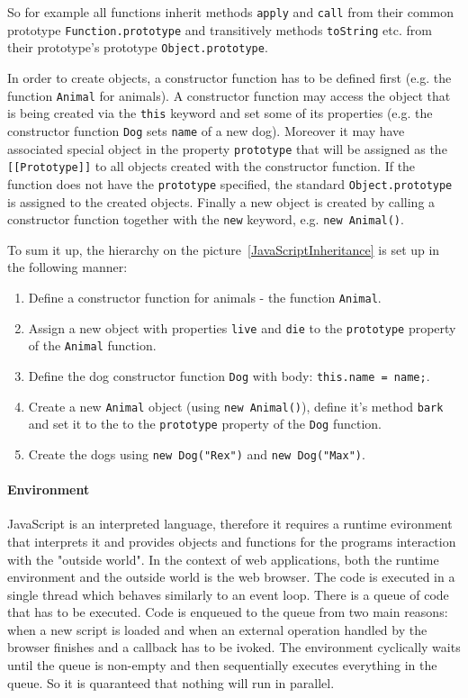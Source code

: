 \documentclass[12pt,a4paper]{report}
\begin{document}
So for example all functions inherit methods \texttt{apply} and \texttt{call} from their common prototype \texttt{Function.prototype} and transitively methods \texttt{toString} etc. from their prototype's prototype \texttt{Object.prototype}.

In order to create objects, a constructor function has to be defined first (e.g. the function \texttt{Animal} for animals). A constructor function may access the object that is being created via the \texttt{this} keyword and set some of its properties (e.g. the constructor function \texttt{Dog} sets \texttt{name} of a new dog). Moreover it may have associated special object in the property \texttt{prototype} that will be assigned as the \texttt{[[Prototype]]} to all objects created with the constructor function. If the function does not have the \texttt{prototype} specified, the standard \texttt{Object.prototype} is assigned to the created objects. Finally a new object is created by calling a constructor function together with the \texttt{new} keyword, e.g. \texttt{new Animal()}.

To sum it up, the hierarchy on the picture~\ref{JavaScriptInheritance} is set up in the following manner:

\begin{enumerate}
\item Define a constructor function for animals - the function \texttt{Animal}.
\item Assign a new object with properties \texttt{live} and \texttt{die} to the \texttt{prototype} property of the \texttt{Animal} function.
\item Define the dog constructor function \texttt{Dog} with body: \texttt{this.name = name;}.
\item Create a new \texttt{Animal} object (using \texttt{new Animal()}), define it's method \texttt{bark} and set it to the to the \texttt{prototype} property of the \texttt{Dog} function.
\item Create the dogs using \texttt{new Dog("Rex")} and \texttt{new Dog("Max")}.
\end{enumerate}

\paragraph{Environment} JavaScript is an interpreted language, therefore it requires a runtime evironment that interprets it and provides objects and functions for the programs interaction with the "outside world". In the context of web applications, both the runtime environment and the outside world is the web browser. The code is executed in a single thread which behaves similarly to an event loop. There is a queue of code that has to be executed. Code is enqueued to the queue from two main reasons: when a new script is loaded and when an external operation handled by the browser finishes and a callback has to be ivoked. The environment cyclically waits until the queue is non-empty and then sequentially executes everything in the queue. So it is quaranteed that nothing will run in parallel.
\end{document}
